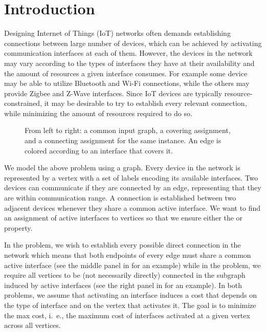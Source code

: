 ﻿\section{Introduction}
Designing Internet of Things (IoT) networks often demands establishing connections between large number of devices, which can be achieved by activating communication interfaces at each of them. However, the devices in the network may vary according to the types of interfaces they have at their availability and the amount of resources a given interface consumes. For example some device may be able to utilize Bluetooth and Wi-Fi connections, while the others may provide Zigbee and Z-Wave interfaces. Since IoT devices are typically resource-constrained, it may be desirable to try to establish every relevant connection, while minimizing the amount of resources required to do so. 

\begin{figure}[t]
\centering

\caption{From left to right: a common input graph, a covering assignment, and a connecting assignment for the same instance. An edge is colored according to an interface that covers it.}
\label{fig:example_problems}
\end{figure}
We model the above problem using a graph. Every device in the network is represented by a vertex with a set of labels encoding its available interfaces. Two devices can communicate if they are connected by an edge, representing that they are within communication range. A connection is established between two adjacent devices whenever they share a common active interface. 
We want to find an assignment of active interfaces to vertices so that we ensure either the \coverage or \connectivity property. 

In the \coverage problem, we wish to establish every possible direct connection in the network which means that both endpoints of every edge must share a common active interface (see the middle panel in  for an example) while in the \connectivity problem, we require all vertices to be (not necessarily directly) connected in the subgraph induced by active interfaces (see the right panel in  for an example). In both problems, we assume that activating an interface induces a cost that depends on the type of interface and on the vertex that activates it. The goal is to minimize the max cost, i.~e., the maximum cost of  interfaces activated at a given vertex across all vertices. 
 

